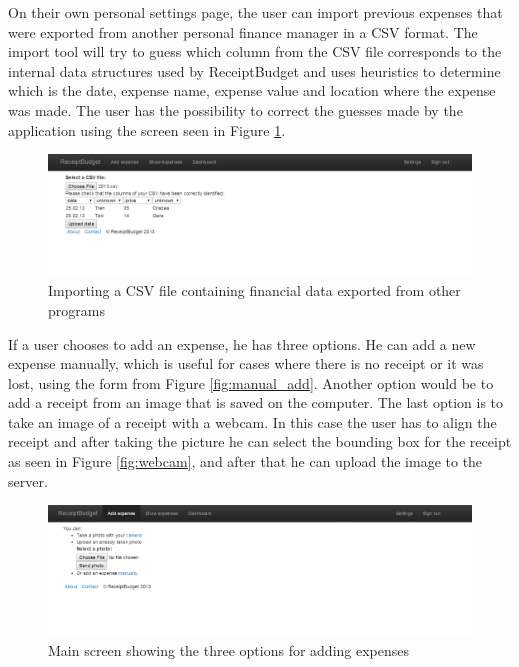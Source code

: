 On their own personal settings page, the user can import previous expenses that were exported from another personal finance manager in a CSV format. The import tool will try to guess which column from the CSV file corresponds to the internal data structures used by ReceiptBudget and uses heuristics to determine which is the date, expense name, expense value and location where the expense was made. The user has the possibility to correct the guesses made by the application using the screen seen in Figure \ref{fig:csv_import}.

\begin{figure}[htdp]
\begin{center}
\includegraphics[width=\linewidth]{img/manual/csv_import.png}
\caption{\label{fig:csv_import}
Importing a CSV file containing financial data exported from other programs}
\end{center}
\end{figure}

If a user chooses to add an expense, he has three options. He can add a new expense manually, which is useful for cases where there is no receipt or it was lost, using the form from Figure \ref{fig:manual_add}. Another option would be to add a receipt from an image that is saved on the computer. The last option is to take an image of a receipt with a webcam. In this case the user has to align the receipt and after taking the picture he can select the bounding box for the receipt as seen in Figure \ref{fig:webcam}, and after that he can upload the image to the server. 

\begin{figure}[htdp]
\begin{center}
\includegraphics[width=\linewidth]{img/manual/add_expense.png}
\caption{\label{fig:add_expense}
Main screen showing the three options for adding expenses}
\end{center}
\end{figure}

